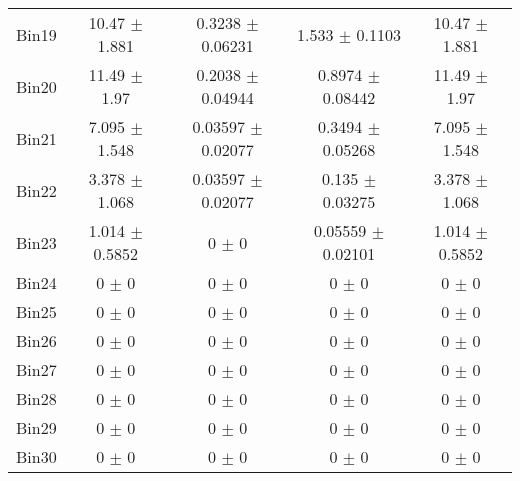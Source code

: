 \begin{tabular}{@{\extracolsep{4pt}}lcccc@{}}
     Bin19 & 10.47 $\pm$ 1.881 & 0.3238 $\pm$ 0.06231 & 1.533 $\pm$ 0.1103 & 10.47 $\pm$ 1.881 \\ 
     Bin20 & 11.49 $\pm$ 1.97 & 0.2038 $\pm$ 0.04944 & 0.8974 $\pm$ 0.08442 & 11.49 $\pm$ 1.97 \\ 
     Bin21 & 7.095 $\pm$ 1.548 & 0.03597 $\pm$ 0.02077 & 0.3494 $\pm$ 0.05268 & 7.095 $\pm$ 1.548 \\ 
     Bin22 & 3.378 $\pm$ 1.068 & 0.03597 $\pm$ 0.02077 & 0.135 $\pm$ 0.03275 & 3.378 $\pm$ 1.068 \\ 
     Bin23 & 1.014 $\pm$ 0.5852 & 0 $\pm$ 0 & 0.05559 $\pm$ 0.02101 & 1.014 $\pm$ 0.5852 \\ 
     Bin24 & 0 $\pm$ 0 & 0 $\pm$ 0 & 0 $\pm$ 0 & 0 $\pm$ 0 \\ 
     Bin25 & 0 $\pm$ 0 & 0 $\pm$ 0 & 0 $\pm$ 0 & 0 $\pm$ 0 \\ 
     Bin26 & 0 $\pm$ 0 & 0 $\pm$ 0 & 0 $\pm$ 0 & 0 $\pm$ 0 \\ 
     Bin27 & 0 $\pm$ 0 & 0 $\pm$ 0 & 0 $\pm$ 0 & 0 $\pm$ 0 \\ 
     Bin28 & 0 $\pm$ 0 & 0 $\pm$ 0 & 0 $\pm$ 0 & 0 $\pm$ 0 \\ 
     Bin29 & 0 $\pm$ 0 & 0 $\pm$ 0 & 0 $\pm$ 0 & 0 $\pm$ 0 \\ 
     Bin30 & 0 $\pm$ 0 & 0 $\pm$ 0 & 0 $\pm$ 0 & 0 $\pm$ 0 \\ 
\hline\hline
  \end{tabular}

